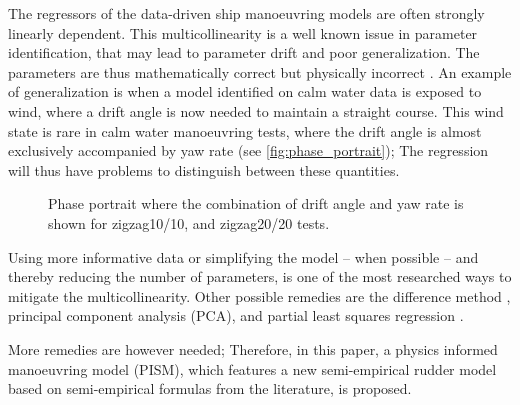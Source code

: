 %
The regressors of the data-driven ship manoeuvring models are often strongly linearly dependent. This multicollinearity is a well known issue in parameter identification, that may lead to parameter drift and poor generalization. The parameters are thus mathematically correct but physically incorrect \citep{luo_parameter_2016}. 
An example of generalization is when a model identified on calm water data is exposed to wind, where a drift angle is now needed to maintain a straight course. This wind state is rare in calm water manoeuvring tests, where the drift angle is almost exclusively accompanied by yaw rate (see \autoref{fig:phase_portrait}); 
The regression will thus have problems to distinguish between these quantities.
%
\begin{figure}[h]
  \centering
  
  \caption{Phase portrait where the combination of drift angle and yaw rate is shown for zigzag10/10, and zigzag20/20 tests.}
  \label{fig:phase_portrait}
\end{figure}
Using more informative data or simplifying the model -- when possible -- and thereby reducing the number of parameters, is one of the most researched ways to mitigate the multicollinearity. Other possible remedies are the difference method \citep{luo_parameter_2016}, principal component analysis (PCA), and partial least squares regression \citep{jian-chuan_parametric_2015}. 

More remedies are however needed; Therefore, in this paper, a physics informed manoeuvring model (PISM), which features a new semi-empirical rudder model based on semi-empirical formulas from the literature, is proposed.

